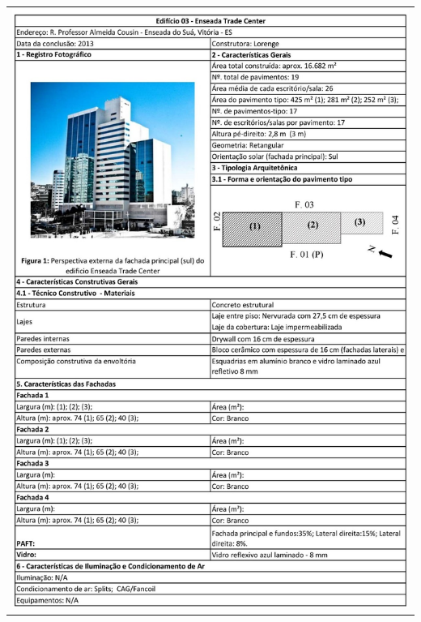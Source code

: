\begin{table}[H]
    \centering
    \begin{tabular}{l}
        \includegraphics[width=\textwidth]{figures/appendices/edificio03.jpg}
    \end{tabular}
\end{table}
\pagebreak
